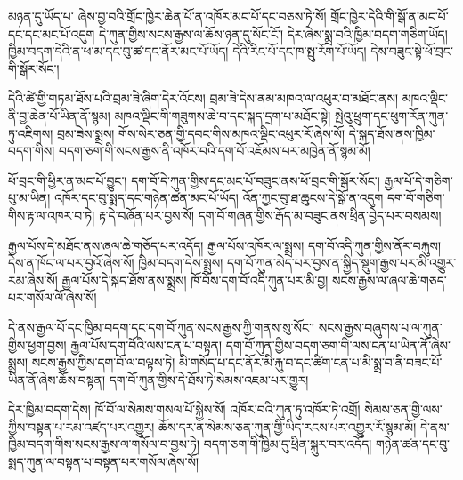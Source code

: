 \documentclass[12pt]{nextbook}
\begin{document}
\begin{readersection}{མཉན་དུ་ཡོད་པ་}
ཞེས་བྱ་བའི་གྲོང་ཁྱེར་ཆེན་པོ་ན་འཁོར་མང་པོ་དང་བཅས་ཏེ་སོ། གྲོང་ཁྱེར་དེའི་གི་སྒོ་ན་མང་པོ་དང་དང་མང་པོ་འདུག དེ་ཀུན་གྱིས་སངས་རྒྱས་ལ་ཆོས་ཉན་དུ་སོང་ངོ་། དེར་ཞེས་སྨྲ་བའི་ཁྱིམ་བདག་གཅིག་ཡོད། ཁྱིམ་བདག་དེའི་ན་ཕ་མ་དང་བུ་ཚ་དང་ནོར་མང་པོ་ཡོད། དེའི་རིང་པོ་དང་ཁ་སྤུ་རོག་པོ་ཡོད། དེས་བཟུང་སྟེ་ཕོ་བྲང་གི་སྒོར་སོང་།

དེའི་ཚེ་གྱི་གཏམ་ཐོས་པའི་བྲམ་ཟེ་ཞིག་དེར་འོངས། བྲམ་ཟེ་དེས་ནམ་མཁའ་ལ་འཕུར་བ་མཐོང་ནས། མཁའ་ལྡིང་ནི་བྱ་ཆེན་པོ་ཡིན་ནོ་སྙམ། མཁའ་ལྡིང་གི་གཟུགས་ཆེ་བ་དང་སྐད་དྲག་པ་མཐོང་སྟེ། སྤེའུ་ཕྲུག་དང་ཕུག་རོན་ཀུན་ཏུ་འཇིགས། བྲམ་ཟེས་སྨྲས། གོས་སེར་ཅན་གྱི་དབང་གིས་མཁའ་ལྡིང་འཕུར་རོ་ཞེས་སོ། དེ་སྐད་ཐོས་ནས་ཁྱིམ་བདག་གིས། བདག་ཅག་གི་སངས་རྒྱས་ནི་འཁོར་བའི་དག་བོ་འཇོམས་པར་མཁྱེན་ནོ་སྙམ་མོ།

ཕོ་བྲང་གི་ཕྱིར་ན་མང་པོ་བྱུང་། དག་བོ་དེ་ཀུན་གྱིས་དང་མང་པོ་བཟུང་ནས་ཕོ་བྲང་གི་སྒོར་སོང་། རྒྱལ་པོ་དེ་གཅིག་པུ་མ་ཡིན། འཁོར་དང་བུ་སྨད་དང་གཉེན་ཚན་མང་པོ་ཡོད། འོན་ཀྱང་བུ་ཐ་ཆུངས་དེ་སྒོ་ན་འདུག དག་བོ་གཅིག་གིས་རྟ་ལ་འཁར་བ་ཏེ། རྟ་དེ་བཞོན་པར་བྱས་སོ། དག་བོ་གཞན་གྱིས་རྒོད་མ་བཟུང་ནས་ཕྲིན་བྱེད་པར་བསམས།

རྒྱལ་པོས་དེ་མཐོང་ནས་ཞལ་ཆེ་གཅོད་པར་འདོད། རྒྱལ་པོས་འཁོར་ལ་སྨྲས། དག་བོ་འདི་ཀུན་གྱིས་ནོར་བརྐུས། དེས་ན་ཁོང་ལ་པར་བྱའོ་ཞེས་སོ། ཁྱིམ་བདག་དེས་སྨྲས། དག་བོ་ཀུན་མེད་པར་བྱས་ན་སྐྱིད་སྡུག་རྒྱས་པར་མི་འགྱུར་རམ་ཞེས་སོ། རྒྱལ་པོས་དེ་སྐད་ཐོས་ནས་སྨྲས། ཁོ་བོས་དག་བོ་འདི་ཀུན་པར་མི་བྱ། སངས་རྒྱས་ལ་ཞལ་ཆེ་གཅད་པར་གསོལ་ལོ་ཞེས་སོ།

དེ་ནས་རྒྱལ་པོ་དང་ཁྱིམ་བདག་དང་དག་བོ་ཀུན་སངས་རྒྱས་ཀྱི་གནས་སུ་སོང་། སངས་རྒྱས་བཞུགས་པ་ལ་ཀུན་གྱིས་ཕྱག་བྱས། རྒྱལ་པོས་དག་བོའི་ལས་ངན་པ་བསྟན། དག་བོ་ཀུན་གྱིས་བདག་ཅག་གི་ལས་ངན་པ་ཡིན་ནོ་ཞེས་སྨྲས། སངས་རྒྱས་ཀྱིས་དག་བོ་ལ་བལྟས་ཏེ། མི་གསོད་པ་དང་ནོར་མི་རྐུ་བ་དང་ཚིག་ངན་པ་མི་སྨྲ་བ་ནི་བཟང་པོ་ཡིན་ནོ་ཞེས་ཆོས་བསྟན། དག་བོ་ཀུན་གྱིས་དེ་ཐོས་ཏེ་སེམས་འཇམ་པར་གྱུར།

དེར་ཁྱིམ་བདག་དེས། ཁོ་བོ་ལ་སེམས་གསལ་པོ་སྐྱེས་སོ། འཁོར་བའི་ཀུན་ཏུ་འཁོར་ཏེ་འགྲོ། སེམས་ཅན་གྱི་ལས་ཀྱིས་བསྟན་པ་རམ་འཛད་པར་འགྱུར། ཆོས་དར་ན་སེམས་ཅན་ཀུན་གྱི་ཡིད་རངས་པར་འགྱུར་རོ་སྙམ་མོ། དེ་ནས་ཁྱིམ་བདག་གིས་སངས་རྒྱས་ལ་གསོལ་བ་བྱས་ཏེ། བདག་ཅག་གི་ཁྱིམ་དུ་ཕྲིན་སྐུར་བར་འདོད། གཉེན་ཚན་དང་བུ་སྨད་ཀུན་ལ་བསྟན་པ་བསྟན་པར་གསོལ་ཞེས་སོ།


\end{readersection}
\end{document}
